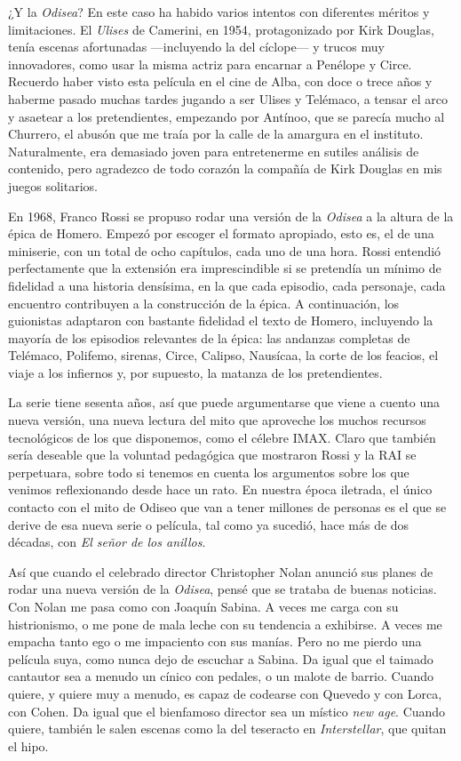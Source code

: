 ¿Y la \emph{Odisea}? En este caso ha habido varios intentos con diferentes méritos y limitaciones. El \emph{Ulises} de Camerini, en 1954, protagonizado por Kirk Douglas, tenía escenas afortunadas ---incluyendo la del cíclope--- y trucos muy innovadores, como usar la misma actriz para encarnar a Penélope y Circe. Recuerdo haber visto esta película en el cine de Alba, con doce o trece años y haberme pasado muchas tardes jugando a ser Ulises y Telémaco, a tensar el arco y asaetear a los pretendientes, empezando por Antínoo, que se parecía mucho al Churrero, el abusón que me traía por la calle de la amargura en el instituto. Naturalmente, era demasiado joven para entretenerme en sutiles análisis de contenido, pero agradezco de todo corazón la compañía de Kirk Douglas en mis juegos solitarios.

En 1968, Franco Rossi se propuso rodar una versión de la \emph{Odisea} a la altura de la épica de Homero. Empezó por escoger el formato apropiado, esto es, el de una miniserie, con un total de ocho capítulos, cada uno de una hora. Rossi entendió perfectamente que la extensión era imprescindible si se pretendía un mínimo de fidelidad a una historia densísima, en la que cada episodio, cada personaje, cada encuentro contribuyen a la construcción de la épica. A continuación, los guionistas adaptaron con bastante fidelidad el texto de Homero, incluyendo la mayoría de los episodios relevantes de la épica: las andanzas completas de Telémaco, Polifemo, sirenas, Circe, Calipso, Nausícaa, la corte de los feacios, el viaje a los infiernos y, por supuesto, la matanza de los pretendientes.

La serie tiene sesenta años, así que puede argumentarse que viene a cuento una nueva versión, una nueva lectura del mito que aproveche los muchos recursos tecnológicos de los que disponemos, como el célebre IMAX. Claro que también sería deseable que la voluntad pedagógica que mostraron Rossi y la RAI se perpetuara, sobre todo si tenemos en cuenta los argumentos sobre los que venimos reflexionando desde hace un rato. En nuestra época iletrada, el único contacto con el mito de Odiseo que van a tener millones de personas es el que se derive de esa nueva serie o película, tal como ya sucedió, hace más de dos décadas, con \emph{El señor de los anillos}.

Así que cuando el celebrado director Christopher Nolan anunció sus planes de rodar una nueva versión de la \emph{Odisea}, pensé que se trataba de buenas noticias. Con Nolan me pasa como con Joaquín Sabina. A veces me carga con su histrionismo, o me pone de mala leche con su tendencia a exhibirse. A veces me empacha tanto ego o me impaciento con sus manías. Pero no me pierdo una película suya, como nunca dejo de escuchar a Sabina. Da igual que el taimado cantautor sea a menudo un cínico con pedales, o un malote de barrio. Cuando quiere, y quiere muy a menudo, es capaz de codearse con Quevedo y con Lorca, con Cohen. Da igual que el bienfamoso director sea un místico \emph{new age}. Cuando quiere, también le salen escenas como la del teseracto en \emph{Interstellar}, que quitan el hipo.

